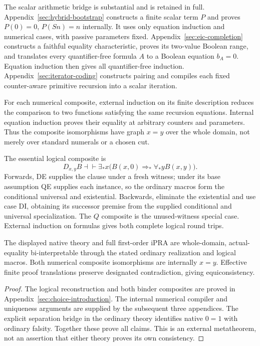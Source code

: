 The scalar arithmetic bridge is substantial and is retained in full.
Appendix~\ref{sec:hybrid-bootstrap} constructs a finite scalar term
$P$ and proves $P(0)=0$, $P(Sn)=n$ internally. It uses only
equation induction and numerical cases, with passive parameters fixed.
Appendix~\ref{sec:eic-completion} constructs a faithful equality
characteristic, proves its two-value Boolean range, and translates
every quantifier-free formula $A$ to a Boolean equation $b_A=0$.
Equation induction then gives all quantifier-free induction.
Appendix~\ref{sec:iterator-coding} constructs pairing and compiles
each fixed counter-aware primitive recursion into a scalar iteration.

For each numerical composite, external induction on its finite
description reduces the comparison to two functions satisfying the
same recursion equations. Internal equation induction proves their
equality at arbitrary counters and parameters. Thus the composite
isomorphisms have graph $x=y$ over the whole domain, not merely over
standard numerals or a chosen cut.

The essential logical composite is
\[
 D_{x,y}B\dashv\vdash
 \exists_*x\bigl(B(x,0)\Rightarrow_*\forall_*yB(x,y)\bigr).
\]
Forwards, DE supplies the clause under a fresh witness; under its
base assumption QE supplies each instance, so the ordinary macros
form the conditional universal and existential. Backwards, eliminate
the existential and use case DI, obtaining its successor premise
from the supplied conditional and universal specialization.
The $Q$ composite is the unused-witness special case. External
induction on formulas gives both complete logical round trips.

\begin{theorem}
The displayed native theory and full first-order iPRA are
whole-domain, actual-equality bi-interpretable through the stated
ordinary realization and logical macros. Both numerical composite
isomorphisms are internally $x=y$. Effective finite proof translations
preserve designated contradiction, giving equiconsistency.
\end{theorem}
\begin{proof}
The logical reconstruction and both binder composites are proved
in Appendix~\ref{sec:choice-introduction}. The internal numerical
compiler and uniqueness arguments are supplied by the subsequent
three appendices. The explicit separation bridge in the ordinary
theory identifies native $0=1$ with ordinary falsity. Together these
prove all claims. This is an external metatheorem, not an assertion
that either theory proves its own consistency.
\end{proof}

